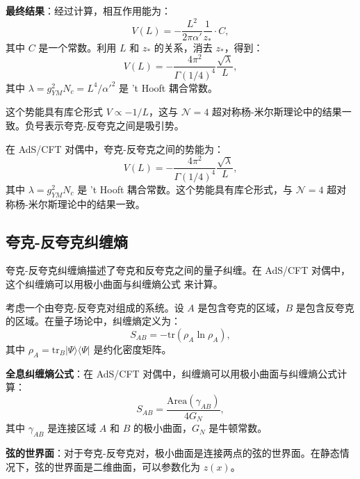 \textbf{最终结果}：经过计算，相互作用能为：
\begin{equation}
    V(L) = -\frac{L^2}{2\pi \alpha'} \frac{1}{z_*} \cdot C,
\end{equation}
其中 $C$ 是一个常数。利用 $L$ 和 $z_*$ 的关系，消去 $z_*$，得到：
\begin{equation}
    V(L) = -\frac{4\pi^2}{\Gamma(1/4)^4} \frac{\sqrt{\lambda}}{L},
\end{equation}
其中 $\lambda = g_{YM}^2 N_c = L^4/\alpha'^2$ 是 't Hooft 耦合常数。

这个势能具有库仑形式 $V \propto -1/L$，这与 $\mathcal{N}=4$ 超对称杨-米尔斯理论中的结果一致。负号表示夸克-反夸克之间是吸引势。

\begin{theorem}[夸克-反夸克势] \label{thm:qq_potential}
在 AdS/CFT 对偶中，夸克-反夸克之间的势能为：
\begin{equation}
    V(L) = -\frac{4\pi^2}{\Gamma(1/4)^4} \frac{\sqrt{\lambda}}{L},
\end{equation}
其中 $\lambda = g_{YM}^2 N_c$ 是 't Hooft 耦合常数。这个势能具有库仑形式，与 $\mathcal{N}=4$ 超对称杨-米尔斯理论中的结果一致。
\end{theorem}

\subsection{夸克-反夸克纠缠熵}

夸克-反夸克纠缠熵描述了夸克和反夸克之间的量子纠缠。在 AdS/CFT 对偶中，这个纠缠熵可以用极小曲面与纠缠熵公式 \cite{Ryu2006} 来计算。

\begin{definition}[夸克-反夸克纠缠熵]
考虑一个由夸克-反夸克对组成的系统。设 $A$ 是包含夸克的区域，$B$ 是包含反夸克的区域。在量子场论中，纠缠熵定义为：
\begin{equation}
    S_{AB} = -\text{tr}(\rho_A \ln \rho_A),
\end{equation}
其中 $\rho_A = \text{tr}_B |\Psi\rangle\langle\Psi|$ 是约化密度矩阵。
\end{definition}

\textbf{全息纠缠熵公式}：在 AdS/CFT 对偶中，纠缠熵可以用极小曲面与纠缠熵公式计算：
\begin{equation}
    S_{AB} = \frac{\text{Area}(\gamma_{AB})}{4 G_N},
\end{equation}
其中 $\gamma_{AB}$ 是连接区域 $A$ 和 $B$ 的极小曲面，$G_N$ 是牛顿常数。

\textbf{弦的世界面}：对于夸克-反夸克对，极小曲面是连接两点的弦的世界面。在静态情况下，弦的世界面是二维曲面，可以参数化为 $z(x)$。

